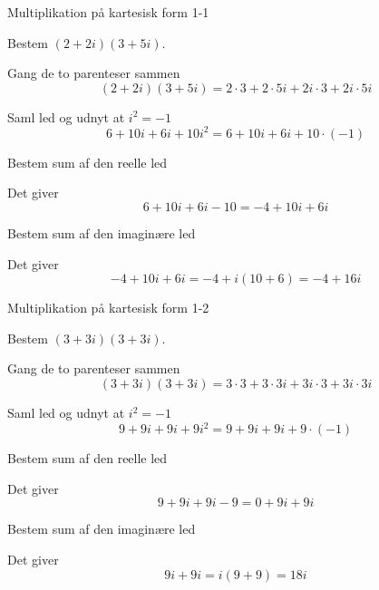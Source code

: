 \documentclass{article}
\begin{document}
\tableofcontents
\newpage

\begin{exercise}{Multiplikation på kartesisk form 1-1}

Bestem $(2+2i)(3+5i)$.


\hint

Gang de to parenteser sammen
\[
(2+2i)(3+5i) = 2 \cdot 3 + 2 \cdot 5i + 2i \cdot 3 + 2i \cdot 5i
\]

\hint 

Saml led og udnyt at $i^2 = -1$
\[
6 + 10i  + 6i + 10i^2 = 6 + 10i +6i + 10 \cdot (-1)
\]

\hint

Bestem sum af den reelle led

\hint

Det giver
\[
6 + 10i +6i - 10 = -4 + 10i + 6i
\]

\hint

Bestem sum af den imaginære led


\hint

Det giver 
\[
-4 + 10i + 6i = -4 + i(10+6) = -4  + 16i
\]

\end{exercise}

\newpage

\begin{exercise}{Multiplikation på kartesisk form 1-2}
	
	Bestem $(3+3i)(3+3i)$.
	
	
	\hint
	
	Gang de to parenteser sammen
	\[
	(3+3i)(3+3i) = 3 \cdot 3 + 3 \cdot 3i + 3i \cdot 3 + 3i \cdot 3i 
	\]
	
	\hint 
	
	Saml led og udnyt at $i^2 = -1$
	\[
	9 + 9i + 9i + 9i^2 = 9 + 9i + 9i + 9 \cdot (-1)
	\]
	
	\hint
	
	Bestem sum af den reelle led
	
	\hint
	
	Det giver
	\[
	9 + 9i + 9i - 9 = 0 + 9i+9i
	\]
	
	\hint
	
	Bestem sum af den imaginære led
	
	
	\hint
	
	Det giver 
	\[
	9i+9i  = i(9+9) = 18i	
	\]
	
\end{exercise}
\end{document}
